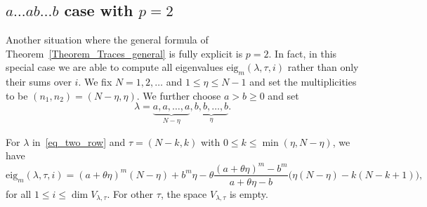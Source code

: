 \subsection{\texorpdfstring{$a\dots ab\dots b$}{a...ab...b} case with \texorpdfstring{$p=2$}{p=2}} Another situation where the general formula of Theorem~\ref{Theorem_Traces_general} is fully explicit is $p=2$. In fact, in this special case we are able to compute all eigenvalues $\mathrm{eig}_m(\lambda,\tau,i)$ rather than only their sums over $i$. We fix $N=1,2,\dots$ and $1\le \eta \le N-1$ and set the multiplicities to be $(n_1,n_2)= (N-\eta,\eta)$. We further choose $a>b\ge 0$ and set
\begin{equation}
\label{eq_two_row}
 \lambda= \underbrace{a,a,\dots,a}_{N-\eta}, \underbrace{b,b,\dots,b}_{\eta}.
\end{equation}
\begin{coro} \label{Corollary_ab}
 For $\lambda$ in~\eqref{eq_two_row} and $\tau=(N-k,k)$ with $0\le k\le \min(\eta,N-\eta)$, we have
 $$
   \mathrm{eig}_m(\lambda,\tau,i) = (a+\theta \eta)^m (N-\eta) + b^m \eta-\theta \frac{(a+\theta \eta)^m- b^m}{a+\theta \eta -b}  \bigl(\eta (N-\eta) -k(N-k+1)\bigr) ,
 $$
 for all $1\le i\le \dim V_{\lambda,\tau}$. For other $\tau$, the space $V_{\lambda,\tau}$ is empty.
\end{coro}
